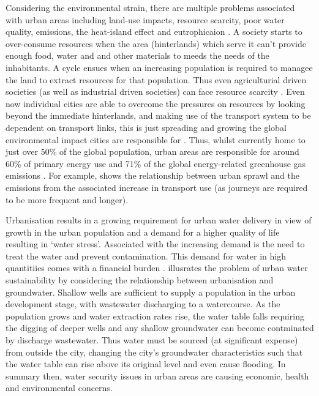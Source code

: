 Considering the environmental strain, there are multiple problems associated with urban areas including land-use impacts, resource scarcity, poor water quality, emissions, the heat-island effect and eutrophicaion \citep{Cai2011}. A society starts to over-consume resources when the area (hinterlands) which serve it can't provide enough food, water and and other materials to meeds the needs of the inhabitants. A cycle ensues when an increasing population is required to managee the land to extract resources for that population. Thus even agriculturial driven societies (as well as industrial driven societies) can face resource scarcity \citep{Haberl2001a, Haberl2001b, Gr2003}. Even now individual cities are able to overcome the pressures on resources by looking beyond the immediate hinterlands, and making use of the transport system to be dependent on transport links, this is just spreading and growing the global environmental impact cities are responsible for \citep{Agudelo-Vera2011}. Thus, whilst currently home to just over 50\% of the global population, urban areas are responsible for around 60\% of primary energy use and 71\% of the global energy-related greenhouse gas emissions \citep{IEA2008}. For example, \citet{Grubler2009} shows the relationship between urban sprawl and the emissions from the associated increase in transport use (as journeys are required to be more frequent and longer).

Urbanisation results in a growing requirement for urban water delivery in view of growth in the urban population and a demand for a higher quality of life resulting in `water stress'. Associated with the increasing demand is the need to treat the water and prevent contamination. This demand for water in high quantitiies comes with a financial burden \citep{Diagger2009}. \citet{Kennedy} illusrates the problem of urban water sustainability by considering the relationship between urbanisation and groundwater. Shallow wells are sufficient to supply a population in the urban development stage, with wastewater discharging to a watercourse. As the population grows and water extraction rates rise, the water table falls requiring the digging of deeper wells and any shallow groundwater can become contminated by discharge wastewater. Thus water must be sourced (at significant expense) from outside the city, changing the city's groundwater characteristics such that the water table can rise above its original level and even cause flooding. In summary then, water security issues in urban areas are causing economic, health and environmental concerns.

